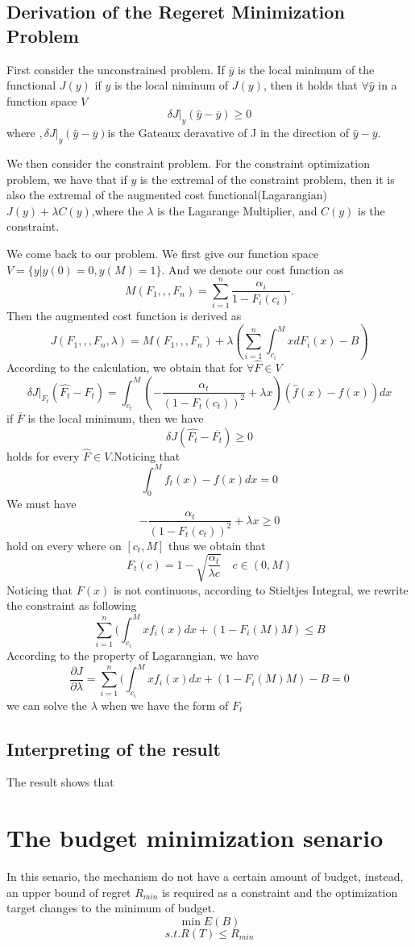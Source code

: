 \documentclass[10pt,conference,compsocconf,letterpaper]{IEEEtran}
\begin{document}
\subsection{Derivation of the Regeret Minimization Problem}
First consider the unconstrained problem. If $\overline{y}$ is the local minimum of the functional $J(y)$
if $y$ is the local niminum of $J(y)$, then it holds that $\forall \hat{y}$ in a function space $V$
\[\delta J|_y(\hat{y}-\overline{y})\geq 0\]
where $,\delta J|_y(\hat{y}-\overline{y})$is the Gateaux deravative of J in the direction of $\hat{y}-\overline{y}$. 

We then consider the constraint problem. For the constraint optimization problem, we have that if $y$ is the extremal of the constraint problem, then it is also the extremal of the augmented cost functional(Lagarangian) $J(y)+\lambda C(y)$,where the $\lambda$ is the Lagarange Multiplier, and $C(y)$ is the constraint.

We come back to our problem. We first give our function space $V=\{y|y(0)=0,y(M)=1\}$. And we denote our cost function as
\[M(F_1,,,F_n)= \sum_{i=1}^n \frac{\alpha_i}{1-F_i(c_i)}.\]
Then the augmented cost function is derived as
\[J(F_1,,,F_n,\lambda)=M(F_1,,,F_n)+\lambda( \sum_{i=1}^n\int_{c_i}^MxdF_i(x)-B) \]
According to the calculation, we obtain that for $\forall \hat{F}\in V$
\[\delta J|_{F_t}(\hat{F_t}-F_t)=\int_{c_t}^M(-\frac{\alpha_t}{(1-F_t(c_t))^2}+\lambda x)(\hat{f}(x)-f(x))dx\]
if $\overline{F}$ is the local minimum, then we have
\[\delta J(\hat{F_t}-\overline{F_t})\geq 0\]
holds for every $\hat{F}\in V$.Noticing that
\[\int_0^Mf_t(x)-f(x)dx=0\]
We must have 
\[-\frac{\alpha_t}{(1-F_t(c_t))^2}+\lambda x\geq 0\]
hold on every where on $[c_t,M]$
thus we obtain that
\[F_t(c)=1-\sqrt{\frac{\alpha_t}{\lambda c}}\quad c\in(0,M)\]
Noticing that $F(x)$ is not continuous, according to Stieltjes Integral, we rewrite the constraint as following
\[ \sum_{i=1}^n(\int_{c_i}^Mxf_i(x)dx+(1-F_i(M)M)\leq B\]
According to the property of Lagarangian, we have
\[\frac{\partial J}{\partial \lambda}=\sum_{i=1}^n(\int_{c_i}^Mxf_i(x)dx+(1-F_i(M)M)-B=0\]
we can solve the $\lambda$ when we have the form of $F_t$

\subsection{Interpreting of the result}
The result shows that

\section{The budget minimization senario}
In this senario, the mechanism do not have a certain amount of budget, instead, an upper bound of regret $R_{min}$ is required as a constraint and the optimization target changes to the minimum of budget.
\[\min E(B)\]
\[s.t. R(T)\leq R_{min}\]
\end{document}
